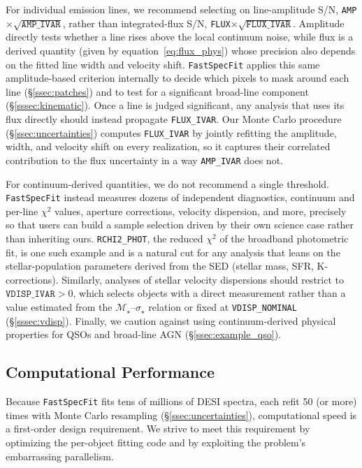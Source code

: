 \documentclass[modern,linenumbers]{aastex702}
\newcommand{\fastspecfit}{\texttt{FastSpecFit}}
\newcommand{\vdisp}{\ensuremath{\sigma_\star}}
\newcommand{\Mstar}{\ensuremath{\mathcal{M}_{\star}}}
\begin{document}
For individual emission lines, we recommend selecting on
line-amplitude S/N, \texttt{AMP}$\times\sqrt{\texttt{AMP\_IVAR}}$,
rather than integrated-flux S/N,
\texttt{FLUX}$\times\sqrt{\texttt{FLUX\_IVAR}}$. Amplitude directly
tests whether a line rises above the local continuum noise, while flux
is a derived quantity (given by equation~\ref{eq:flux_phys}) whose
precision also depends on the fitted line width and velocity
shift. \fastspecfit{} applies this same amplitude-based criterion
internally to decide which pixels to mask around each line
(\S\ref{ssec:patches}) and to test for a significant broad-line
component (\S\ref{sssec:kinematic}). Once a line is judged
significant, any analysis that uses its flux directly should instead
propagate \texttt{FLUX\_IVAR}. Our Monte Carlo procedure
(\S\ref{ssec:uncertainties}) computes \texttt{FLUX\_IVAR} by jointly
refitting the amplitude, width, and velocity shift on every
realization, so it captures their correlated contribution to the flux
uncertainty in a way \texttt{AMP\_IVAR} does not.

For continuum-derived quantities, we do not recommend a single
threshold. \fastspecfit{} instead measures dozens of independent
diagnostics, continuum and per-line $\chi^2$ values, aperture
corrections, velocity dispersion, and more, precisely so that users
can build a sample selection driven by their own science case rather
than inheriting ours. \texttt{RCHI2\_PHOT}, the reduced $\chi^2$ of
the broadband photometric fit, is one such example and is a natural
cut for any analysis that leans on the stellar-population parameters
derived from the SED (stellar mass, SFR, K-corrections). Similarly,
analyses of stellar velocity dispersions should restrict to
$\texttt{VDISP\_IVAR}>0$, which selects objects with a direct
measurement rather than a value estimated from the \Mstar--\vdisp{}
relation or fixed at \texttt{VDISP\_NOMINAL}
(\S\ref{sssec:vdisp}). Finally, we caution against using
continuum-derived physical properties for QSOs and broad-line AGN
(\S\ref{ssec:example_qso}).

\subsection{Computational Performance}
\label{ssec:performance}

Because \fastspecfit{} fits tens of millions of DESI spectra, each
refit 50 (or more) times with Monte Carlo resampling
(\S\ref{ssec:uncertainties}), computational speed is a first-order
design requirement. We strive to meet this requirement by optimizing
the per-object fitting code and by exploiting the problem's
embarrassing parallelism.
\end{document}
